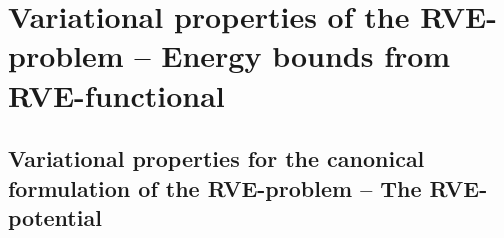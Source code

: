 \documentclass[12pt,a4paper]{article}
\renewcommand{\ta}[1]{\mathbfit{#1}}
\renewcommand{\ts}[1]{\mathbfit{#1}}
\renewcommand{\Box}{\mdlgwhtsquare}
\newcommand{\rve}{
  {\mathchoice
   {\mbox{\scalebox{0.67}{$\Box$}}}
   {\mbox{\scalebox{0.67}{$\Box$}}}
   {\mbox{\scalebox{0.5}{$\Box$}}}
   {\mbox{\scalebox{0.375}{$\Box$}}}
  }
}
\begin{document}
%
%
%


\section{Variational properties of the RVE-problem -- Energy bounds from RVE-functional}

\subsection{Variational properties for the canonical formulation of the RVE-problem -- The RVE-potential}
\end{document}
